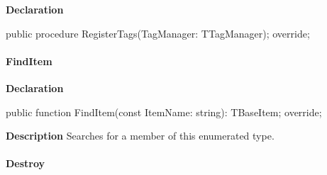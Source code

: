 \documentclass{report}
\newif\ifpdf
\begin{document}
\label{PasDoc_Items.TPasEnum-RegisterTags}
\begin{list}{}{
\setlength{\itemindent}{0cm}
\setlength{\listparindent}{0cm}
\setlength{\leftmargin}{\evensidemargin}
\addtolength{\leftmargin}{\tmplength}
\settowidth{\labelsep}{X}
\addtolength{\leftmargin}{\labelsep}
\setlength{\labelwidth}{\tmplength}
}
\item[\textbf{Declaration}\hfill]
\ifpdf
\begin{flushleft}
\fi
\begin{ttfamily}
public procedure RegisterTags(TagManager: TTagManager); override;\end{ttfamily}

\ifpdf
\end{flushleft}
\fi

\end{list}
\paragraph*{FindItem}\hspace*{\fill}

\label{PasDoc_Items.TPasEnum-FindItem}
\begin{list}{}{
\setlength{\itemindent}{0cm}
\setlength{\listparindent}{0cm}
\setlength{\leftmargin}{\evensidemargin}
\addtolength{\leftmargin}{\tmplength}
\settowidth{\labelsep}{X}
\addtolength{\leftmargin}{\labelsep}
\setlength{\labelwidth}{\tmplength}
}
\item[\textbf{Declaration}\hfill]
\ifpdf
\begin{flushleft}
\fi
\begin{ttfamily}
public function FindItem(const ItemName: string): TBaseItem; override;\end{ttfamily}

\ifpdf
\end{flushleft}
\fi

\par
\item[\textbf{Description}]
Searches for a member of this enumerated type.

\end{list}
\paragraph*{Destroy}\hspace*{\fill}
\end{document}
